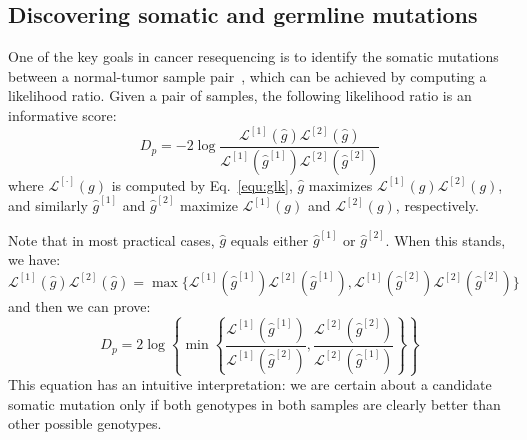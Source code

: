 \documentclass{bioinfo}
\begin{document}
\begin{methods}

\subsection{Discovering somatic and germline mutations}
One of the key goals in cancer resequencing is to identify the somatic
mutations between a normal-tumor sample pair~\citep{Robison:2010ys}, which can
be achieved by computing a likelihood ratio.  Given a pair of samples, 
the following likelihood ratio is an informative score:
\begin{equation}\label{eq:dp}
D_p=-2\log\frac{\mathcal{L}^{[1]}(\hat{g})\mathcal{L}^{[2]}(\hat{g})}{\mathcal{L}^{[1]}(\hat{g}^{[1]})\mathcal{L}^{[2]}(\hat{g}^{[2]})}
\end{equation}
where $\mathcal{L}^{[\cdot]}(g)$ is computed by Eq.~\eqref{equ:glk}, $\hat{g}$
maximizes $\mathcal{L}^{[1]}(g)\mathcal{L}^{[2]}(g)$, and similarly
$\hat{g}^{[1]}$ and $\hat{g}^{[2]}$ maximize $\mathcal{L}^{[1]}(g)$ and
$\mathcal{L}^{[2]}(g)$, respectively.

Note that in most practical cases, $\hat{g}$ equals either
$\hat{g}^{[1]}$ or $\hat{g}^{[2]}$.  When this stands, we have:
$$
\mathcal{L}^{[1]}(\hat{g})\mathcal{L}^{[2]}(\hat{g})=\max\big\{
\mathcal{L}^{[1]}(\hat{g}^{[1]})\mathcal{L}^{[2]}(\hat{g}^{[1]}), \mathcal{L}^{[1]}(\hat{g}^{[2]})\mathcal{L}^{[2]}(\hat{g}^{[2]})
\big\}
$$
and then we can prove:
$$
D_p=2\log\left\{ \min\left\{\frac{\mathcal{L}^{[1]}(\hat{g}^{[1]})}{\mathcal{L}^{[1]}(\hat{g}^{[2]})},\frac{\mathcal{L}^{[2]}(\hat{g}^{[2]})}{\mathcal{L}^{[2]}(\hat{g}^{[1]})}\right\}\right\}
$$
This equation has an intuitive interpretation: we are certain about a candidate
somatic mutation only if both genotypes in both samples are clearly better
than other possible genotypes.


\end{methods}
\end{document}
